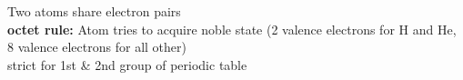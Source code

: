 Two atoms share electron pairs\\
\textbf{octet rule:} Atom tries to acquire noble state (2 valence electrons for H and He, 8 valence electrons for all other)\\
    strict for 1st \& 2nd group of periodic table 
    